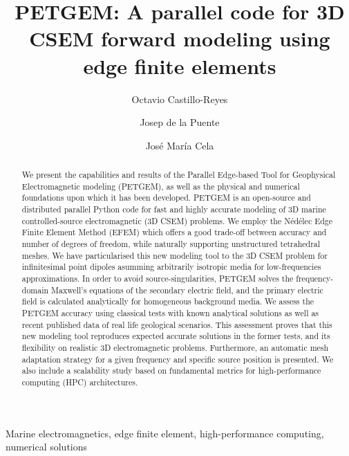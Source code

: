 \documentclass[review]{elsarticle}
\begin{document}
\begin{frontmatter}

\title{PETGEM: A parallel code for 3D CSEM forward modeling using edge finite elements}

\author[mymainaddress]{Octavio Castillo-Reyes}

\author[mymainaddress]{Josep de la Puente}
\author[mymainaddress]{Jos\'e Mar\'ia Cela}

\address[mymainaddress]{Barcelona Supercomputing Center (BSC) \\ c/Jordi Girona, 29. 08034 Barcelona, Spain}


\begin{abstract}
We present the capabilities and results of the Parallel Edge-based Tool for Geophysical Electromagnetic modeling (PETGEM), as well as the physical and numerical foundations upon which it has been developed. PETGEM is an open-source and distributed parallel Python code for fast and highly accurate modeling of 3D marine controlled-source electromagnetic (3D CSEM) problems. We employ the N\'ed\'elec Edge Finite Element Method (EFEM) which offers a good trade-off between accuracy and number of degrees of freedom, while naturally supporting unstructured tetrahedral meshes. We have particularised this new modeling tool to the 3D CSEM problem for infinitesimal point dipoles asumming arbitrarily isotropic media for low-frequencies approximations. In order to avoid source-singularities, PETGEM solves the frequency-domain Maxwell's equations of the secondary electric field, and the primary electric field is calculated analytically for homogeneous background media. We assess the PETGEM accuracy using classical tests with known analytical solutions as well as recent published data of real life geological scenarios. This assessment proves that this new modeling tool reproduces expected accurate solutions in the former tests, and its flexibility on realistic 3D electromagnetic problems. Furthermore, an automatic mesh adaptation strategy for a given frequency and specific source position is presented. We also include a scalability study based on fundamental metrics for high-performance computing (HPC) architectures.
\end{abstract}

\begin{keyword}
Marine electromagnetics, edge finite element, high-performance computing, numerical solutions
\end{keyword}

\end{frontmatter}
\end{document}
